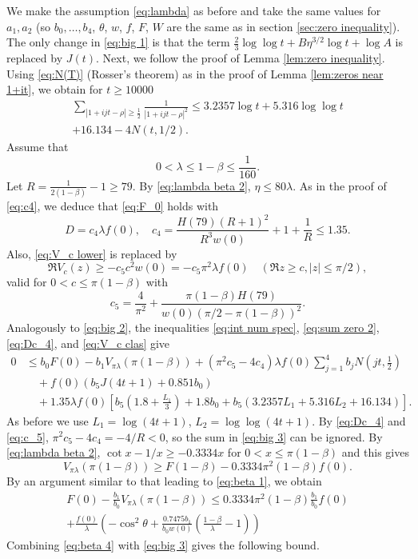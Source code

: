 \documentclass[10pt]{amsart}
\theoremstyle{remark}
\theoremstyle{plain}
\numberwithin{equation}{section}
\theoremstyle{definition}
\def\({\left(}
\def\){\right)}
\def\lam{\lambda}
\newcommand{\be}{\begin{equation}}
\begin{document}
 We make
the assumption \eqref{eq:lambda} as before and take the same values for
$a_1,a_2$ (so $b_0,\ldots,b_4$, $\theta$, $w$, $f$, $F$, $W$ are the same
as in section \ref{sec:zero inequality}).
The only change in \eqref{eq:big 1}
is that the term $\frac23 \log\log t+B\eta^{3/2}
\log t + \log A$ is replaced by $J(t)$.
Next, we follow the proof of Lemma \ref{lem:zero inequality}.
Using \eqref{eq:N(T)} (Rosser's theorem) as in the proof of Lemma 
\ref{lem:zeros near 1+it}, we obtain for $t\ge 10000$
\begin{multline}
\sum_{|1+ijt-\rho|\ge \frac12} \frac{1}{|1+ijt-\rho|^2} \le
3.2357\log t + 5.316\log\log t \\
 + 16.134-4N(t,1/2).
\label{eq:sum zero 2}
\end{multline}
Assume that
\be
0 < \lambda \le 1-\beta \le \frac{1}{160}.
\label{eq:lambda beta 2}
\end{equation}
Let $R=\frac{1}{2(1-\beta)}-1 \ge 79$.  By \eqref{eq:lambda beta 2},
$\eta \le 80\lambda$.  As in the proof of \eqref{eq:c4}, we deduce
that \eqref{eq:F_0} holds with
\be
D = c_4 \lambda f(0), \quad c_4=\frac{H(79)(R+1)^2}{R^3 w(0)}+1+\frac{1}{R}
\le 1.35.
\label{eq:Dc_4}
\end{equation}
Also, \eqref{eq:V_c lower} is replaced by
\be
\Re V_c(z) \ge -c_5 c^2 w(0) = -c_5 \pi^2 \lambda f(0) \quad
(\Re z \ge c, |z|\le \pi/2),
\label{eq:V_c clas}
\end{equation}
valid for $0<c \le \pi(1-\beta)$ with
\be
c_5 = \frac{4}{\pi^2} + \frac{\pi(1-\beta) H(79)}{w(0) (\pi/2-\pi(1-\beta))^2}.
\label{eq:c_5}
\end{equation}
Analogously to \eqref{eq:big 2}, the inequalities \eqref{eq:int num spec},
\eqref{eq:sum zero 2},
\eqref{eq:Dc_4}, and \eqref{eq:V_c clas} give
\be
\begin{split}
0 &\le b_0 F(0)-b_1 V_{\pi \lam} (\pi(1-\beta)) + (\pi^2 c_5-4c_4) \lam f(0)
\sum_{j=1}^4 b_j N(jt,\tfrac12) \\
&\quad + f(0) \( b_5 J(4t+1) + 0.851b_0\) \\
&\quad + 1.35 \lam f(0) \left[ b_5(1.8+\tfrac{L_1}3)+1.8b_0+b_5(3.2357 L_1 +
 5.316 L_2+16.134) \right].
\end{split}
\label{eq:big 3}
\end{equation}
As before we use $L_1=\log(4t+1)$, $L_2=\log\log(4t+1)$.
By \eqref{eq:Dc_4} and \eqref{eq:c_5}, $\pi^2 c_5-4c_4=-4/R<0$, so the
sum in \eqref{eq:big 3} can be ignored.  By \eqref{eq:lambda beta 2},
$\cot x - 1/x \ge -0.3334 x$ for $0<x\le \pi(1-\beta)$ and this gives
$$
V_{\pi\lam}(\pi(1-\beta)) \ge F(1-\beta)-0.3334\pi^2 (1-\beta) f(0).
$$
By an argument similar to that leading to \eqref{eq:beta 1}, we obtain
\begin{multline}
F(0)-\frac{b_1}{b_0} V_{\pi\lam}(\pi(1-\beta)) \le 0.3334\pi^2 (1-\beta)
\frac{b_1}{b_0} f(0)\\
 + \frac{f(0)}{\lam} \(-\cos^2\theta+\frac{0.7475b_1}
{b_0 w(0)} \( \frac{1-\beta}{\lam}-1\)\)
\label{eq:beta 4}
\end{multline}
Combining \eqref{eq:beta 4} with \eqref{eq:big 3} gives the following bound.
\end{document}
